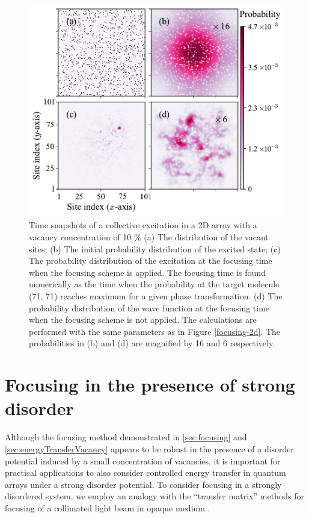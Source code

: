 \begin{figure}[htbp]
\centering
\includegraphics[width=\linewidth]{focusing-with-vacancy.pdf}
\caption{  Time snapshots of a collective excitation in a 2D
array with a vacancy concentration of 10 \%  (a) The distribution of the vacant sites; (b) The initial probability distribution of the excited state; (c) The probability distribution of the excitation at the
focusing time when the focusing scheme is applied. The focusing
time is  found numerically as  the time when the probability at the target
molecule (71, 71) reaches maximum  for a given phase transformation. (d) The probability
distribution of the wave function at the focusing time when the
focusing scheme is not applied. The calculations are performed
with the same parameters as in Figure \ref{focusing-2d}. The
probabilities in (b) and (d) are magnified by 16 and 6
respectively. } \label{focusing-with-vacancy}
\end{figure}

\section{Focusing in the presence of strong disorder}
\label{sec:focusingStrongDisorder}


Although the focusing method demonstrated in \autoref{sec:focusing} and \autoref{sec:energyTransferVacancy} appears to be robust in the presence of a disorder potential induced by a small concentration of vacancies, it is important for practical applications to also consider controlled energy transfer in quantum arrays under a strong disorder potential. To consider focusing in a strongly disordered system, 
we employ an analogy with the {``transfer
matrix'' methods for focusing of a collimated light beam in opaque
medium \cite{opaque-1, Gigan-TMeasure-PRL10, Mosk-NPhot10, Cizmar-NPhot10, Silberberg-11, Chatel-Focusing-11, Lagendijk-Focusing-11, zhenia-11, cui-11, kim-11}}.



